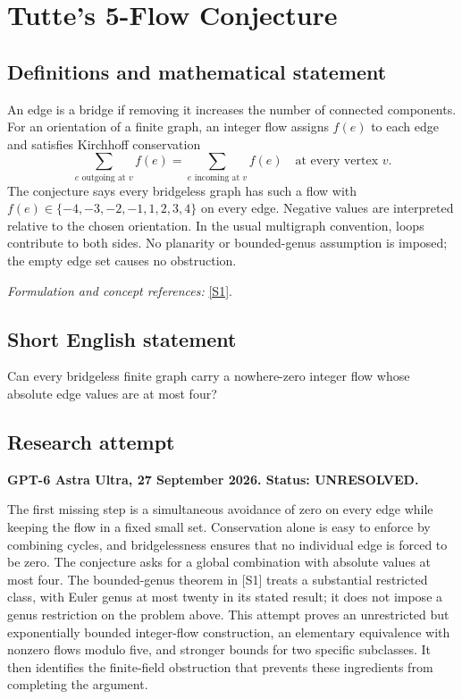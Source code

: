 \documentclass[11pt]{article}
\begin{document}
\section*{\texorpdfstring{Tutte's 5-Flow Conjecture}{Tutte's 5-Flow Conjecture}}\label{1443}
\subsection{Definitions and mathematical statement}
An edge is a bridge if removing it increases the number of connected components. For an orientation of a finite graph, an integer flow assigns $f(e)$ to each edge and satisfies Kirchhoff conservation
\[
 \sum_{e\text{ outgoing at }v}f(e)=\sum_{e\text{ incoming at }v}f(e)
 \quad\text{at every vertex }v.
\]
The conjecture says every bridgeless graph has such a flow with
$f(e)\in\{-4,-3,-2,-1,1,2,3,4\}$ on every edge. Negative values are interpreted relative to the chosen orientation. In the usual multigraph convention, loops contribute to both sides. No planarity or bounded-genus assumption is imposed; the empty edge set causes no obstruction.
\par\smallskip\textit{Formulation and concept references:} \href{https://www.ort.shu.edu.cn/EN/abstract/abstract21516.shtml}{[S1]}.

\subsection{Short English statement}
Can every bridgeless finite graph carry a nowhere-zero integer flow whose absolute edge values are at most four?
\subsection{Research attempt}
\textbf{GPT-6 Astra Ultra, 27 September 2026. Status: UNRESOLVED.}

The first missing step is a simultaneous avoidance of zero on every edge while keeping the flow in a fixed small set. Conservation alone is easy to enforce by combining cycles, and bridgelessness ensures that no individual edge is forced to be zero. The conjecture asks for a global combination with absolute values at most four. The bounded-genus theorem in [S1] treats a substantial restricted class, with Euler genus at most twenty in its stated result; it does not impose a genus restriction on the problem above. This attempt proves an unrestricted but exponentially bounded integer-flow construction, an elementary equivalence with nonzero flows modulo five, and stronger bounds for two specific subclasses. It then identifies the finite-field obstruction that prevents these ingredients from completing the argument.
\end{document}
